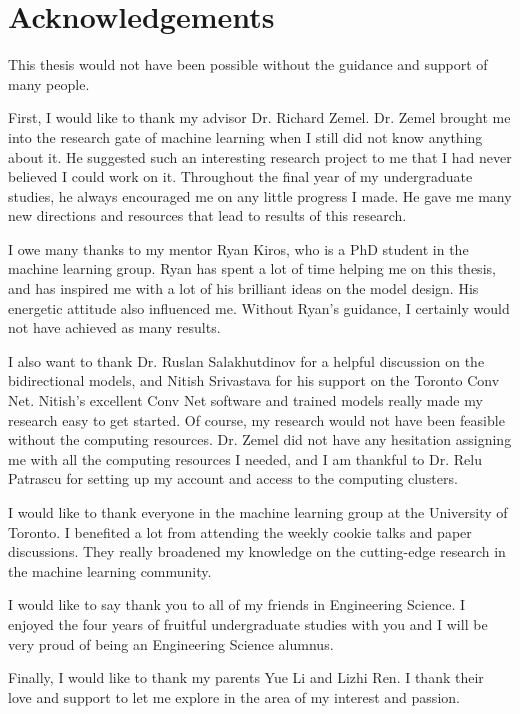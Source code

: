 \chapter*{Acknowledgements}
This thesis would not have been possible without the guidance and support of many people. 

First, I would like to thank my advisor Dr. Richard Zemel. Dr. Zemel brought me into the research gate of machine learning when I still did not know anything about it. He suggested such an interesting research project to me that I had never believed I could work on it. Throughout the final year of my undergraduate studies, he always encouraged me on any little progress I made. He gave me many new directions and resources that lead to results of this research.

I owe many thanks to my mentor Ryan Kiros, who is a PhD student in the machine learning group. Ryan has spent a lot of time helping me on this thesis, and has inspired me with a lot of his brilliant ideas on the model design. His energetic attitude also influenced me. Without Ryan's guidance, I certainly would not have achieved as many results. 

I also want to thank Dr. Ruslan Salakhutdinov for a helpful discussion on the bidirectional models, and Nitish Srivastava for his support on the Toronto Conv Net. Nitish's excellent Conv Net software and trained models really made my research easy to get started.  Of course, my research would not have been feasible without the computing resources. Dr. Zemel did not have any hesitation assigning me with all the computing resources I needed, and I am thankful to Dr. Relu Patrascu for setting up my account and access to the computing clusters. 

I would like to thank everyone in the machine learning group at the University of Toronto. I benefited a lot from attending the weekly cookie talks and paper discussions. They really broadened my knowledge on the cutting-edge research in the machine learning community.

I would like to say thank you to all of my friends in Engineering Science. I enjoyed the four years of fruitful undergraduate studies with you and I will be very proud of being an Engineering Science alumnus.

Finally, I would like to thank my parents Yue Li and Lizhi Ren. I thank their love and support to let me explore in the area of my interest and passion. 
